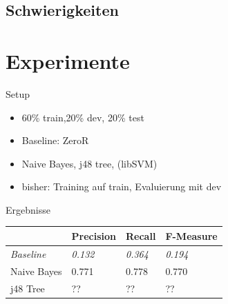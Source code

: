 \documentclass[10pt]{beamer}
\begin{document}
\subsection{Schwierigkeiten}
\section{Experimente}
\begin{frame}{Setup}

\begin{itemize}
	\item 60\% train,20\% dev, 20\% test
	\item Baseline: ZeroR
	\item Naive Bayes, j48 tree, (libSVM)
	\item bisher: Training auf train, Evaluierung mit dev
\end{itemize}

\end{frame}

\begin{frame}{Ergebnisse}
\begin{table}[h]
\begin{tabular}{l|lll}
                  & Precision      & Recall         & F-Measure      \\ \hline
\textit{Baseline} & \textit{0.132} & \textit{0.364} & \textit{0.194} \\ \hline
Naive Bayes       & 0.771          & 0.778          & 0.770          \\
j48 Tree          & ??             & ??             & ??            
\end{tabular}
\end{table}
\end{frame}
\end{document}
